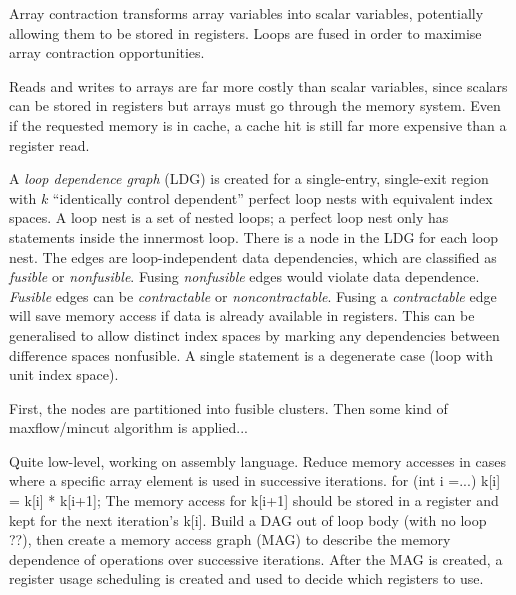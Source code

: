 Array contraction transforms array variables into scalar variables,
potentially allowing them to be stored in registers.
Loops are fused in order to maximise array contraction opportunities.

Reads and writes to arrays are far more costly than scalar variables, since
scalars can be stored in registers but arrays must go through the memory system.
Even if the requested memory is in cache, a cache hit is still far more expensive than a register read.

A \emph{loop dependence graph} (LDG) is created for a single-entry, single-exit region with $k$ ``identically control dependent'' perfect loop nests with equivalent index spaces.
A loop nest is a set of nested loops; a perfect loop nest only has statements inside the innermost loop.
There is a node in the LDG for each loop nest.
The edges are loop-independent data dependencies, which are classified as \emph{fusible} or \emph{nonfusible}.
Fusing \emph{nonfusible} edges would violate data dependence. \emph{Fusible} edges can be \emph{contractable} or \emph{noncontractable}.
Fusing a \emph{contractable} edge will save memory access if data is already available in registers.
This can be generalised to allow distinct index spaces by marking any dependencies between difference spaces nonfusible. A single statement is a degenerate case (loop with unit index space).

First, the nodes are partitioned into fusible clusters. Then some kind of maxflow/mincut algorithm is applied...







Quite low-level, working on assembly language.
Reduce memory accesses in cases where a specific array element is used in successive iterations.
  for (int i =...)
    k[i] = k[i] * k[i+1];
The memory access for k[i+1] should be stored in a register and kept for the next iteration's k[i].
Build a DAG out of loop body (with no loop ??), then create a memory access graph (MAG) to describe the memory dependence of operations over successive iterations.
After the MAG is created, a register usage scheduling is created and used to decide which registers to use.
